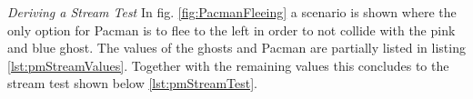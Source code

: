 \emph{Deriving a Stream Test} \newline
In fig. \ref{fig:PacmanFleeing} a scenario is shown where the only option for Pacman is to flee to the left in order to not collide with the pink and blue ghost. The values of the ghosts and Pacman are partially listed in listing \ref{lst:pmStreamValues}. Together with the remaining values this concludes to the stream test shown below \ref{lst:pmStreamTest}.
\newline 
\begin{figure}[!h]
	\centering

\end{figure}
